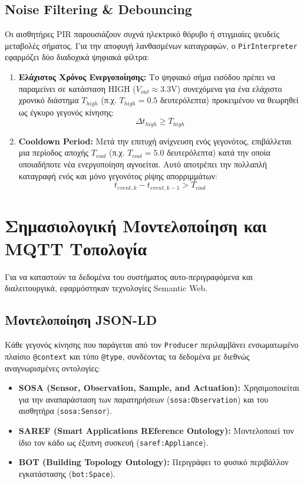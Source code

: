 \documentclass[acmsmall,screen,nonacm]{acmart}
\begin{document}
	\subsection{Noise Filtering \& Debouncing}
	Οι αισθητήρες PIR παρουσιάζουν συχνά ηλεκτρικό θόρυβο ή στιγμιαίες ψευδείς μεταβολές σήματος. Για την αποφυγή λανθασμένων καταγραφών, ο \texttt{PirInterpreter} εφαρμόζει δύο διαδοχικά ψηφιακά φίλτρα:
	
	\begin{enumerate}
		\item \textbf{Ελάχιστος Χρόνος Ενεργοποίησης:} Το ψηφιακό σήμα εισόδου πρέπει να παραμείνει σε κατάσταση HIGH ($V_{out} \approx 3.3\text{V}$) συνεχόμενα για ένα ελάχιστο χρονικό διάστημα $T_{high}$ (π.χ. $T_{high} = 0.5$ δευτερόλεπτα) προκειμένου να θεωρηθεί ως έγκυρο γεγονός κίνησης:
		\begin{equation}
			\Delta t_{high} \ge T_{high}
		\end{equation}
		\item \textbf{Cooldown Period:} Μετά την επιτυχή ανίχνευση ενός γεγονότος, επιβάλλεται μια περίοδος αποχής $T_{cool}$ (π.χ. $T_{cool} = 5.0$ δευτερόλεπτα) κατά την οποία οποιαδήποτε νέα ενεργοποίηση αγνοείται. Αυτό αποτρέπει την πολλαπλή καταγραφή ενός και μόνο γεγονότος ρίψης απορριμμάτων:
		\begin{equation}
			t_{event, k} - t_{event, k-1} > T_{cool}
		\end{equation}
	\end{enumerate}
	
	\section{Σημασιολογική Μοντελοποίηση και MQTT Τοπολογία}
	Για να καταστούν τα δεδομένα του συστήματος αυτο-περιγραφόμενα και διαλειτουργικά, εφαρμόστηκαν τεχνολογίες Semantic Web. 
	
	\subsection{Μοντελοποίηση JSON-LD}
	Κάθε γεγονός κίνησης που παράγεται από τον \texttt{Producer} περιλαμβάνει ενσωματωμένο πλαίσιο \texttt{@context} και τύπο \texttt{@type}, συνδέοντας τα δεδομένα με διεθνώς αναγνωρισμένες οντολογίες:
	\begin{itemize}
		\item \textbf{SOSA (Sensor, Observation, Sample, and Actuation):} Χρησιμοποιείται για την αναπαράσταση των παρατηρήσεων (\texttt{sosa:Observation}) και του αισθητήρα (\texttt{sosa:Sensor}).
		\item \textbf{SAREF (Smart Applications REference Ontology):} Μοντελοποιεί τον ίδιο τον κάδο ως έξυπνη συσκευή (\texttt{saref:Appliance}).
		\item \textbf{BOT (Building Topology Ontology):} Περιγράφει το φυσικό περιβάλλον εγκατάστασης (\texttt{bot:Space}).
	\end{itemize}
	
\end{document}
